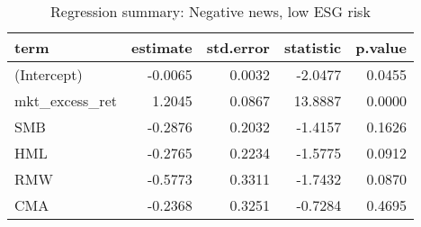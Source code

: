 \begin{table}[H]
\centering
\caption{Regression summary: Negative news, low ESG risk}
\begin{tabular}{lrrrr}
  \hline
term & estimate & std.error & statistic & p.value \\ 
  \hline
(Intercept) & -0.0065 & 0.0032 & -2.0477 & 0.0455 \\ 
  mkt\_excess\_ret & 1.2045 & 0.0867 & 13.8887 & 0.0000 \\ 
  SMB & -0.2876 & 0.2032 & -1.4157 & 0.1626 \\ 
  HML & -0.2765 & 0.2234 & -1.5775 & 0.0912 \\ 
  RMW & -0.5773 & 0.3311 & -1.7432 & 0.0870 \\ 
  CMA & -0.2368 & 0.3251 & -0.7284 & 0.4695 \\ 
   \hline
\end{tabular}
\label{tab: summary_neg_ESG_L}
\end{table}


